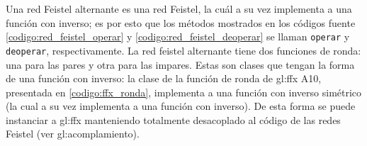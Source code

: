 Una red Feistel alternante es una red Feistel, la cuál a su vez implementa a
una función con inverso; es por esto que los métodos mostrados en los códigos
fuente \ref{codigo:red_feistel_operar} y \ref{codigo:red_feistel_deoperar} se
llaman \texttt{operar} y \texttt{deoperar}, respectivamente. La red feistel
alternante tiene dos funciones de  ronda: una para las pares y otra para las
impares. Estas son clases que  tengan la forma de una función con inverso: la
clase de la función de ronda de \gls{gl:ffx} A10, presentada en
\ref{codigo:ffx_ronda}, implementa a una función con inverso simétrico (la cual
a su vez implementa a una función con inverso). De esta forma se puede
instanciar a \gls{gl:ffx} manteniendo totalmente desacoplado al código de las
redes Feistel (ver \gls{gl:acomplamiento}).
